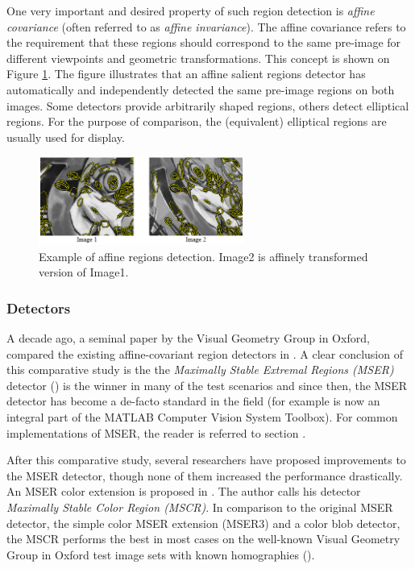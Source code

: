 One very important and desired property of such region detection is {\em affine covariance} (often referred to as {\em affine invariance}).  The affine covariance refers to the requirement that these regions should correspond to the same pre-image for different viewpoints and geometric transformations. This concept is shown on Figure \ref{fig:affreg}. The figure illustrates that an affine salient regions detector has automatically and independently detected the same pre-image regions on both images. Some detectors provide arbitrarily shaped regions, others detect elliptical regions. For the purpose of comparison, the (equivalent) elliptical regions are usually used for display.
\begin{figure}[H]
\begin{center}
\includegraphics[width=0.6\textwidth]{fig/AffineRegions}
\end{center}
\caption{Example of affine regions detection. Image2 is affinely transformed version of Image1.}
\label{fig:affreg}
\end{figure}

\subsubsection{Detectors}
A decade ago, a seminal paper by the Visual Geometry Group in Oxford, compared the existing affine-covariant region detectors in \cite{Mikolajczyk:2005}. A clear conclusion of this comparative study is the the  {\em  Maximally Stable Extremal Regions (MSER)} detector (\cite{Matas2002BMVC}) is the winner in many of the test scenarios and since then, the MSER detector has become a de-facto standard in the field (for example is now an integral part of the MATLAB Computer Vision System Toolbox). For common implementations of MSER, the reader is referred to section .

After this comparative study, several researchers have proposed improvements to the MSER detector, though none of them increased the performance drastically. 
An MSER color extension is proposed in \cite{Forssen07}. The author calls his detector {\em Maximally Stable Color Region (MSCR)}. In comparison to the original MSER detector, the simple color MSER extension (MSER3) and a color blob detector, the MSCR performs the best in most cases on the well-known Visual Geometry Group in Oxford test image sets with known homographies (\cite{vgg_soft_data}). 

